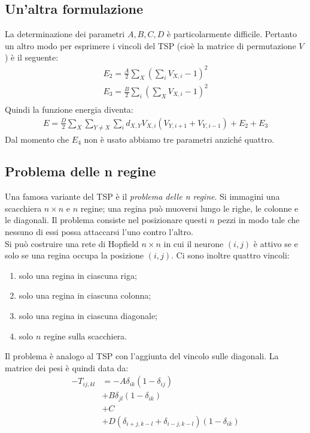 \subsection{Un'altra formulazione} %
\label{sub:un_altra_formulazione}
La determinazione dei parametri $A, B, C, D$ è particolarmente difficile. Pertanto un altro modo per esprimere i vincoli del TSP (cioè la matrice di permutazione $V$) è il seguente:
\begin{align*}
	E_2 = \frac{A}{2} \sum_X \left(\sum_i V_{X, i} - 1 \right) ^ 2 \tag{Vincolo sulle righe} \\
	E_3 = \frac{B}{2} \sum_i \left(\sum_X V_{X, i} - 1 \right) ^ 2 \tag{Vincolo sulle colonne} \\
\end{align*}
Quindi la funzione energia diventa:
\begin{align*}
	E = \frac{D}{2} \sum_{X} \sum_{Y \neq X} \sum_i d_{X,Y} V_{X,i}(V_{Y, i + 1} + V_{Y, i - 1}) + E_2 + E_3
\end{align*}
Dal momento che $E_4$ non è usato abbiamo tre parametri anziché quattro.


\subsection{Problema delle n regine} %
\label{sub:problema_delle_n_regine}
Una famosa variante del TSP è il \emph{problema delle n regine}. Si immagini una scacchiera $n \times n$ e $n$ regine; una regina può muoversi lungo le righe, le colonne e le diagonali. Il problema consiste nel posizionare questi $n$ pezzi in modo tale che nessuno di essi possa attaccarsi l'uno contro l'altro.\\

Si può costruire una rete di Hopfield $n \times n$ in cui il neurone $(i,j)$ è attivo se e solo se una regina occupa la posizione $(i,j)$. Ci sono inoltre quattro vincoli:
\begin{enumerate}
    \item solo una regina in ciascuna riga;
    \item solo una regina in ciascuna colonna;
    \item solo una regina in ciascuna diagonale;
    \item solo $n$ regine sulla scacchiera.
\end{enumerate}

\newpage

Il problema è analogo al TSP con l'aggiunta del vincolo sulle diagonali. La matrice dei pesi è quindi data da:
\begin{align*}
	- T_{ij,kl} &= - A \delta_{ik} (1 - \delta_{ij}) \tag{peso inibitorio in ogni riga}\\
	& + B \delta_{jl} (1 - \delta_{ik}) \tag{peso inibitorio in ogni colonna} \\
	& + C  \qquad \tag{Inibizione globale}\\
	& + D (\delta_{i+j,k-l} + \delta_{i-j, k-l})(1 - \delta_{ik}) \tag{peso inibitorio sulle diagonale}
\end{align*}

\newpage

